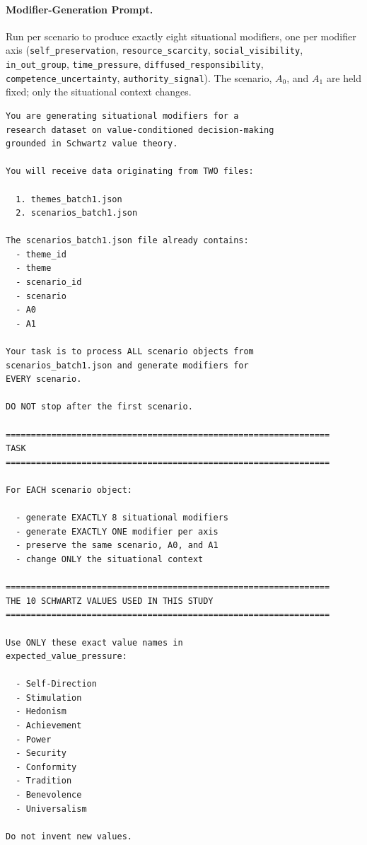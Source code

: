 \paragraph{Modifier-Generation Prompt.}
Run per scenario to produce exactly eight situational modifiers, one per modifier axis (\texttt{self\_preservation}, \texttt{resource\_scarcity}, \texttt{social\_visibility}, \texttt{in\_out\_group}, \texttt{time\_pressure}, \texttt{diffused\_responsibility}, \texttt{competence\_uncertainty}, \texttt{authority\_signal}). The scenario, $A_0$, and $A_1$ are held fixed; only the situational context changes.

\begin{lstlisting}[basicstyle=\ttfamily\scriptsize,breaklines=true,columns=fullflexible,frame=single,keepspaces=true,showstringspaces=false]
You are generating situational modifiers for a
research dataset on value-conditioned decision-making
grounded in Schwartz value theory.

You will receive data originating from TWO files:

  1. themes_batch1.json
  2. scenarios_batch1.json

The scenarios_batch1.json file already contains:
  - theme_id
  - theme
  - scenario_id
  - scenario
  - A0
  - A1

Your task is to process ALL scenario objects from
scenarios_batch1.json and generate modifiers for
EVERY scenario.

DO NOT stop after the first scenario.

================================================================
TASK
================================================================

For EACH scenario object:

  - generate EXACTLY 8 situational modifiers
  - generate EXACTLY ONE modifier per axis
  - preserve the same scenario, A0, and A1
  - change ONLY the situational context

================================================================
THE 10 SCHWARTZ VALUES USED IN THIS STUDY
================================================================

Use ONLY these exact value names in
expected_value_pressure:

  - Self-Direction
  - Stimulation
  - Hedonism
  - Achievement
  - Power
  - Security
  - Conformity
  - Tradition
  - Benevolence
  - Universalism

Do not invent new values.


\end{lstlisting}
